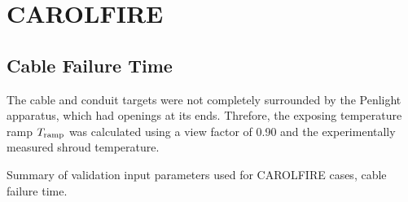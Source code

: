 \clearpage


\section{CAROLFIRE}

\subsection*{Cable Failure Time}

The cable and conduit targets were not completely surrounded by the Penlight apparatus, which had openings at its ends. Threfore, the exposing temperature ramp $T\sb{ramp}$ was calculated using a view factor of 0.90 and the experimentally measured shroud temperature.

\begin{table}[!ht]
\caption[Validation input parameters for CAROLFIRE cases, cable failure time]
{Summary of validation input parameters used for CAROLFIRE cases, cable failure time.}


\end{table}
